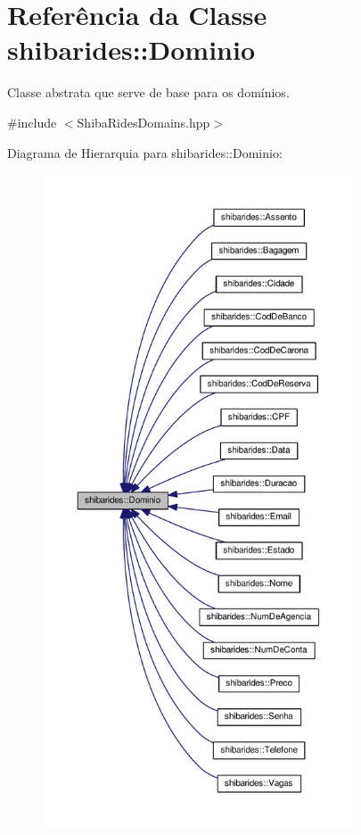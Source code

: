 \hypertarget{classshibarides_1_1Dominio}{}\section{Referência da Classe shibarides\+:\+:Dominio}
\label{classshibarides_1_1Dominio}


Classe abstrata que serve de base para os domínios.  




{\ttfamily \#include $<$Shiba\+Rides\+Domains.\+hpp$>$}



Diagrama de Hierarquia para shibarides\+:\+:Dominio\+:
\nopagebreak
\begin{figure}[H]
\begin{center}
\leavevmode
\includegraphics[height=550pt]{classshibarides_1_1Dominio__inherit__graph}
\end{center}
\end{figure}
